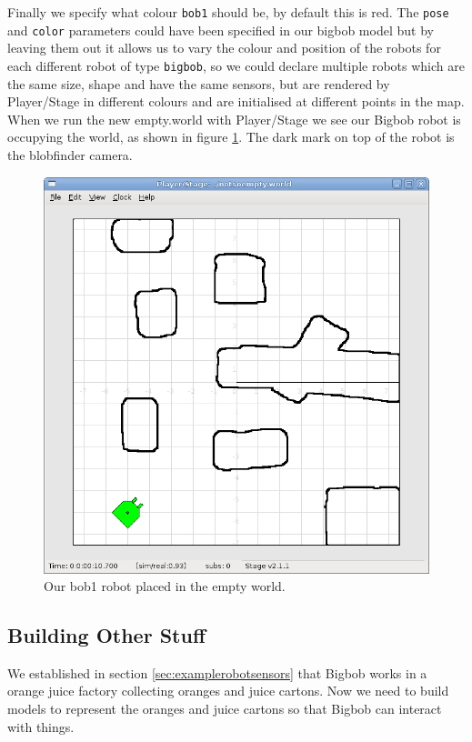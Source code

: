 \documentclass[a4paper]{article}
\newcommand{\plst}{Player/Stage\xspace}
\begin{document}
Finally we specify what colour \verb|bob1| should be, by default this is red. The \verb|pose| and \verb|color| parameters could have been specified in our bigbob model but by leaving them out it allows us to vary the colour and position of the robots for each different robot of type \verb|bigbob|, so we could declare multiple robots which are the same size, shape and have the same sensors, but are rendered by \plst in different colours and are initialised at different points in the map.\newline
When we run the new empty.world with \plst we see our Bigbob robot is occupying the world, as shown in figure \ref{fig:finalRobotBuild}. The dark mark on top of the robot is the blobfinder camera.

\begin{figure}
	\centering
	\includegraphics[width=0.7\linewidth]{./pics/robot_building/final_robot_build.png} 
	\caption{Our bob1 robot placed in the empty world.}
	\label{fig:finalRobotBuild}
\end{figure}


\subsection{Building Other Stuff} \label{sec:otherStuff}
We established in section \ref{sec:examplerobotsensors} that Bigbob works in a orange juice factory collecting oranges and juice cartons. Now we need to build models to represent the oranges and juice cartons so that Bigbob can interact with things.
\end{document}
